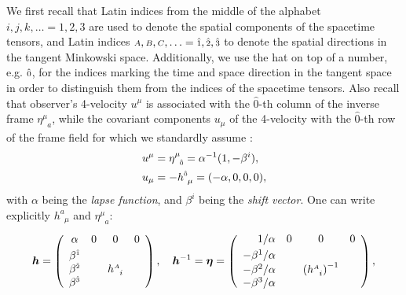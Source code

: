 \documentclass[
10pt, %
a4paper, %
oneside, %
headinclude,footinclude, %
BCOR5mm, %
]{scrartcl}
\newcommand{\sA}{\mathsmaller A}
\newcommand{\sB}{\mathsmaller B}
\newcommand{\sC}{\mathsmaller C}
\newcommand{\tetrsymbol}{h}
\newcommand{\itetrsymbol}{\eta}
\newcommand{\itetr}[2]{\itetrsymbol^{#1}_{\phantom{#1}#2}}
\newcommand{\tetr}[2]{\tetrsymbol^{#1}_{\phantom{#1}#2}}
\newcommand{\indalg}[1]{\hat{\mathsmaller{#1}}}
\newcommand{\lapse}{\alpha}
\newcommand{\shift}[1]{\beta^{#1}}
\begin{document}
We first recall that Latin indices from the middle of the alphabet $ i,j,k,\ldots=1,2,3 $ are used 
to 
denote the spatial components of the 
spacetime 
tensors, and Latin indices $ \sA,\sB,\sC,\ldots = \indalg{1},\indalg{2},\indalg{3} $ to denote the 
spatial 
directions in the tangent Minkowski space. Additionally, we use the hat on top of a number, e.g. $ 
\indalg{0} $, for the indices   marking the time and space direction in the tangent space in order 
to distinguish them 
from the indices of the spacetime tensors.  Also recall that observer's 4-velocity 
$ 
u^\mu $ is associated with the $ \hat{0} $-th column of the 
inverse frame $ \itetr{\mu}{a} $, while the covariant components $ u_\mu $ of the 4-velocity with 
the $ 
\hat{0} $-th row of the frame field for which we standardly assume 
\cite{Alcubierre2008,RezzollaZanottiBook}:
\begin{subequations}\label{eqn.4vel}
	\begin{align}
		u^{\mu} &= \itetr{\mu}{\indalg{0}}  = \lapse^{-1}(1,-\shift{i}), %
		\\
		u_\mu   &= - \tetr{\indalg{0}}{\mu} = (-\lapse,0,0,0),
	\end{align}
\end{subequations}
with $ \lapse $ being the \emph{lapse function}, and $ \shift{i} $ being the \emph{shift vector}. 
One can write explicitly $ \tetr{a}{\mu} $ and $ \itetr{\mu}{a} $:
\begin{equation}\label{eqn.h.eta.matrix}
	\bm{\tetrsymbol} = \left(
	\begin{array}{cccc}
		\alpha          & 0 & 0 & 0 \\[1mm]
		\beta^{\indalg{1}} &  &  &  \\
		\beta^{\indalg{2}} &  & \tetr{\sA}{i} &  \\
		\beta^{\indalg{3}} &  &  & 
	\end{array}
	\right) ,
	\quad
	\bm{h}^{-1} = \bm{\itetrsymbol} = \left(
	\begin{array}{rlcl}
		1/\alpha          & 0 & 0 & 0 \\[1mm]
		-\beta^{1}/\alpha &  &  &  \\
		-\beta^{2}/\alpha &  & \left (\tetr{\sA}{i}\right )^{-1} &  \\
		-\beta^{3}/\alpha &  &  & 
	\end{array}
	\right) ,
\end{equation}
\end{document}
